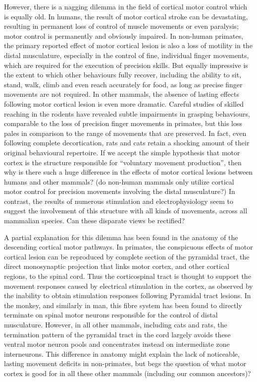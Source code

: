 However, there is a nagging dilemma in the field of cortical motor control which is equally old. In humans, the result of motor cortical stroke can be devastating, resulting in permanent loss of control of muscle movements or even paralysis; motor control is permanently and obviously impaired. In non-human primates, the primary reported effect of motor cortical lesion is also a loss of motility in the distal musculature, especially in the control of fine, individual finger movements, which are required for the execution of precision skills. But equally impressive is the extent to which other behaviours fully recover, including the ability to sit, stand, walk, climb and even reach accurately for food, as long as precise finger movements are not required. In other mammals, the absence of lasting effects following motor cortical lesion is even more dramatic. Careful studies of skilled reaching in the rodents have revealed subtle impairments in grasping behaviours, comparable to the loss of precision finger movements in primates, but this loss pales in comparison to the range of movements that are preserved. In fact, even following complete decortication, rats and cats retain a shocking amount of their original behavioural repertoire. If we accept the simple hypothesis that motor cortex is the structure responsible for ``voluntary movement production'', then why is there such a huge difference in the effects of motor cortical lesions between humans and other mammals? (do non-human mammals only utilize cortical motor control for precision movements involving the distal musculature?) In contrast, the results of numerous stimulation and electrophysiology seem to suggest the involvement of this structure with all kinds of movements, across all mammalian species. Can these disparate views be rectified?

A partial explanation for this dilemma has been found in the anatomy of the descending cortical motor pathways. In primates, the conspicuous effects of motor cortical lesion can be reproduced by complete section of the pyramidal tract, the direct monosynaptic projection that links motor cortex, and other cortical regions, to the spinal cord. Thus the corticospinal tract is thought to support the movement responses caused by electrical stimulation in the cortex, as observed by the inability to obtain stimulation responses following Pyramidal tract lesions. In the monkey, and similarly in man, this fibre system has been found to directly terminate on spinal motor neurons responsible for the control of distal musculature. However, in all other mammals, including cats and rats, the termination pattern of the pyramidal tract in the cord largely avoids these ventral motor neuron pools and concentrates instead on intermediate zone interneurons. This difference in anatomy might explain the lack of noticeable, lasting movement deficits in non-primates, but begs the question of what motor cortex is good for in all these other mammals (including our common ancestors)? 

